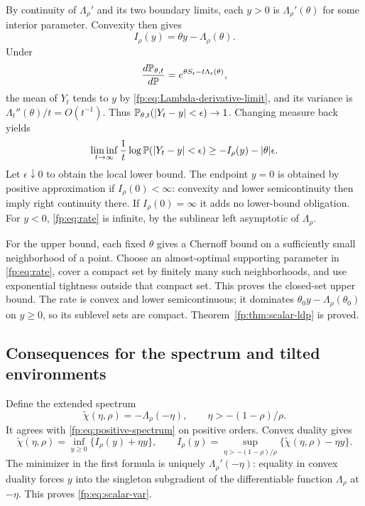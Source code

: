 By continuity of $\Lambda_\rho'$ and its two boundary limits, each $y>0$ is $\Lambda_\rho'(\theta)$ for some interior parameter. Convexity then gives
\[
 I_\rho(y)=\theta y-\Lambda_\rho(\theta).
\]
Under
\[
 \frac{d\mathbb P_{\theta,t}}{d\mathbb P}
 =e^{\theta S_t-t\Lambda_t(\theta)},
\]
the mean of $Y_t$ tends to $y$ by \eqref{fp:eq:Lambda-derivative-limit}, and its variance is $\Lambda_t''(\theta)/t=O(t^{-1})$. Thus $\mathbb P_{\theta,t}(|Y_t-y|<\epsilon)\to1$. Changing measure back yields
\[
 \liminf_{t\to\infty}\frac1t\log\mathbb P(|Y_t-y|<\epsilon)
 \ge-I_\rho(y)-|\theta|\epsilon.
\]
Let $\epsilon\downarrow0$ to obtain the local lower bound. The endpoint $y=0$ is obtained by positive approximation if $I_\rho(0)<\infty$: convexity and lower semicontinuity then imply right continuity there. If $I_\rho(0)=\infty$ it adds no lower-bound obligation. For $y<0$, \eqref{fp:eq:rate} is infinite, by the sublinear left asymptotic of $\Lambda_\rho$.

For the upper bound, each fixed $\theta$ gives a Chernoff bound on a sufficiently small neighborhood of a point. Choose an almost-optimal supporting parameter in \eqref{fp:eq:rate}, cover a compact set by finitely many such neighborhoods, and use exponential tightness outside that compact set. This proves the closed-set upper bound. The rate is convex and lower semicontinuous; it dominates $\theta_0y-\Lambda_\rho(\theta_0)$ on $y\ge0$, so its sublevel sets are compact. Theorem~\ref{fp:thm:scalar-ldp} is proved.

\subsection{Consequences for the spectrum and tilted environments}
Define the extended spectrum
\[
 \widetilde\chi(\eta,\rho)=-\Lambda_\rho(-\eta),
 \qquad \eta>-(1-\rho)/\rho.
\]
It agrees with \eqref{fp:eq:positive-spectrum} on positive orders. Convex duality gives
\begin{equation}\label{fp:eq:duality-extended}
 \widetilde\chi(\eta,\rho)=\inf_{y\ge0}\{I_\rho(y)+\eta y\},\qquad
 I_\rho(y)=\sup_{\eta>-(1-\rho)/\rho}
 \{\widetilde\chi(\eta,\rho)-\eta y\}.
\end{equation}
The minimizer in the first formula is uniquely $\Lambda_\rho'(-\eta)$: equality in convex duality forces $y$ into the singleton subgradient of the differentiable function $\Lambda_\rho$ at $-\eta$. This proves \eqref{fp:eq:scalar-var}.

